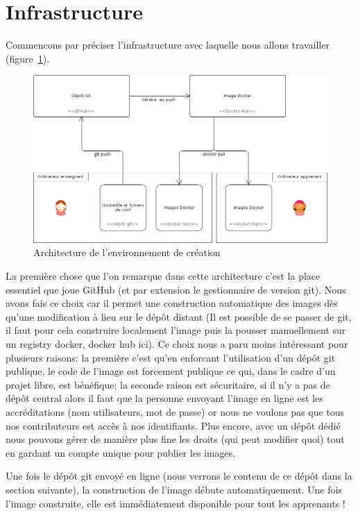 \documentclass[a4paper,11pt]{report}
\begin{document}
\section{Infrastructure}

Commencons par préciser l'infrastructure avec laquelle nous allons travailler (figure~\ref{infrastructure-creation}).

\begin{figure}[!h]
   \caption{\label{infrastructure-creation} Architecture de l'environnement de création}
   \centering
   \includegraphics[width=\textwidth, keepaspectratio=true]{infrastructure-creation.png}
\end{figure}

La première chose que l'on remarque dans cette architecture c'est la place essentiel que joue GitHub (et par extension le gestionnaire de version git). Nous avons fais ce choix car il permet une construction automatique des images dès qu'une modification à lieu sur le dépôt distant (Il est possible de se passer de git, il faut pour cela construire localement l'image puis la pousser manuellement sur un registry docker, docker hub ici). Ce choix nous a paru moins intéressant pour plusieurs raisons: la première c'est qu'en enforcant l'utilisation d'un dépôt git publique, le code de l'image est forcement publique ce qui, dans le cadre d'un projet libre, est bénéfique; la seconde raison est sécuritaire, si il n'y a pas de dépôt central alors il faut que la personne envoyant l'image en ligne est les accréditations (nom utilisateurs, mot de passe) or nous ne voulons pas que tous nos contributeurs est accès à nos identifiants. Plus encore, avec un dépôt dédié nous pouvons gérer de manière plus fine les droits (qui peut modifier quoi) tout en gardant un compte unique pour publier les images.

Une fois le dépôt git envoyé en ligne (nous verrons le contenu de ce dépôt dans la section suivante), la construction de l'image débute automatiquement. Une fois l'image construite, elle est immédiatement disponible pour tout les apprenants !
\end{document}
